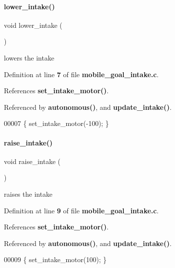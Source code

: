\paragraph{lower\+\_\+intake()}
{\footnotesize\ttfamily void lower\+\_\+intake (\begin{DoxyParamCaption}{ }\end{DoxyParamCaption})}



lowers the intake 



Definition at line \textbf{ 7} of file \textbf{ mobile\+\_\+goal\+\_\+intake.\+c}.



References \textbf{ set\+\_\+intake\+\_\+motor()}.



Referenced by \textbf{ autonomous()}, and \textbf{ update\+\_\+intake()}.


\begin{DoxyCode}
00007 \{ set_intake_motor(-100); \}
\end{DoxyCode}
\mbox{\label{a00131_aa46a9341d1eb7b39a2ef4cc5079ee3ca}} 
\paragraph{raise\+\_\+intake()}
{\footnotesize\ttfamily void raise\+\_\+intake (\begin{DoxyParamCaption}{ }\end{DoxyParamCaption})}



raises the intake 



Definition at line \textbf{ 9} of file \textbf{ mobile\+\_\+goal\+\_\+intake.\+c}.



References \textbf{ set\+\_\+intake\+\_\+motor()}.



Referenced by \textbf{ autonomous()}, and \textbf{ update\+\_\+intake()}.


\begin{DoxyCode}
00009 \{ set_intake_motor(100); \}
\end{DoxyCode}
\mbox{\label{a00131_ab31e12bb0fa46c77906a048666b699d5}} 
